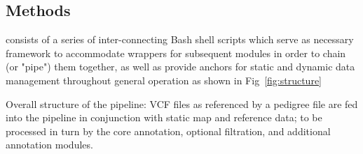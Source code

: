 \begin{methods}

\section{Methods}

\app consists of a series of inter-connecting Bash shell scripts which serve as necessary framework to accommodate wrappers for subsequent modules in order to chain (or "pipe") them together, as well as provide anchors for static and dynamic data management throughout general operation as shown in Fig~\ref{fig:structure}

 {Overall structure of the \app pipeline: VCF files as referenced by a pedigree file are fed into the pipeline in conjunction with static map and reference data; to be processed in turn by the core annotation, optional filtration, and additional annotation modules.} 







\end{methods}